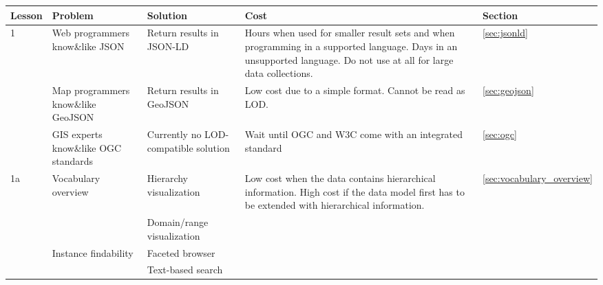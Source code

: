 \documentclass[a4paper]{scrartcl}
\begin{document}
\begin{landscape}
  \begin{table}
    \begin{tabular}{|p{1.25cm}|p{4cm}|p{4cm}|p{10cm}|p{1cm}|}
      \hline
      \textbf{Lesson} & \textbf{Problem} & \textbf{Solution} & \textbf{Cost} & \textbf{Section} \\
      \hline
      \hline
      1 & Web programmers know\&like JSON & Return results in JSON-LD & Hours when used for smaller result sets and when programming in a supported language.  Days in an unsupported language.  Do not use at all for large data collections. & \ref{sec:jsonld} \\
      \cline{2-4}
      & Map programmers know\&like GeoJSON & Return results in GeoJSON & Low cost due to a simple format.  Cannot be read as LOD. & \ref{sec:geojson} \\
      \cline{2-4}
      & GIS experts know\&like OGC standards & Currently no LOD-compatible solution & Wait until OGC and W3C come with an integrated standard & \ref{sec:ogc} \\
      \hline
      1a & Vocabulary overview & Hierarchy visualization & Low cost when the data contains hierarchical information.  High cost if the data model first has to be extended with hierarchical information. & \ref{sec:vocabulary_overview}\\
      \cline{3-3}
      & & Domain/range visualization & \\
      \cline{2-3}
      & Instance findability  & Faceted browser & \\
      \cline{3-4}
      & & Text-based search & \\
      \hline
    \end{tabular}
  \end{table}
\end{landscape}

\end{document}
